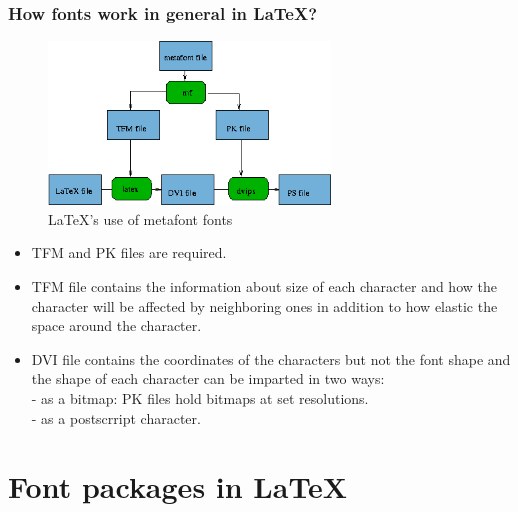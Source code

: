 \documentclass{beamer}
\begin{document}
\begin{frame}[fragile]
\frametitle{How fonts work in general in \LaTeX{}?}
\vspace{-0.3cm}
\begin{figure}[h!]
\centering
\includegraphics[width=7.5cm]{fig.png}
\vspace{-0.3cm}
\caption{\tiny{\LaTeX{}'s use of metafont fonts}}
\end{figure}
\vspace{-0.75cm}
\begin{itemize}
  \item \scriptsize{TFM and PK files are required.}
  \item \scriptsize{TFM file contains the information about size of each character and how the character will be affected by           neighboring ones in addition to how elastic the space around the character.}
  \item \scriptsize{DVI file contains the coordinates of the characters but not the font shape and the shape of each 
         character can be imparted in two ways:\\
        - as a bitmap: PK files hold bitmaps at set resolutions.\\
        - as a postscrript character.}
\end{itemize}
\end{frame}

\section{Font packages in \LaTeX{}}
\end{document}
